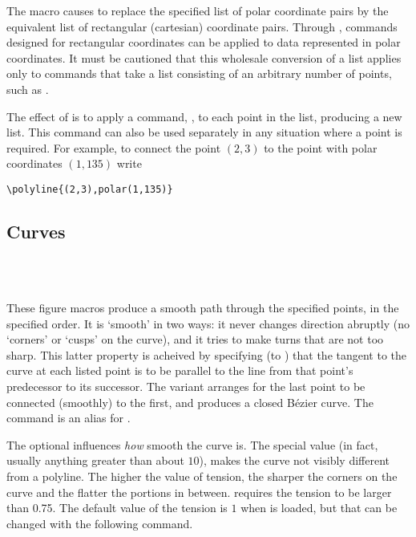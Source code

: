 \documentclass[letterpaper]{article}
\begin{document}
The macro  causes \MF{} to replace the specified list of polar
coordinate pairs by the equivalent list of rectangular (cartesian)
coordinate pairs. Through , commands designed for rectangular
coordinates can be applied to data represented in polar coordinates. It
must be cautioned that this wholesale conversion of a list applies only
to commands that take a list consisting of an arbitrary number of
points, such as .

The effect of  is to apply a \MF{} command, , to each
point in the list, producing a new list. This \MF{} command can also be
used separately in any situation where a \MF{} point is required. For
example, to connect the point $(2,3)$ to the point with polar
coordinates $(1, 135)$ write
\begin{verbatim}
\polyline{(2,3),polar(1,135)}
\end{verbatim}


\subsection{Curves}\label{curves}

\begin{cd}
\\
\\
%
%
%
\end{cd}

These figure macros produce a smooth path through the specified points,
in the specified order. It is `smooth' in two ways: it never changes
direction abruptly (no `corners' or `cusps' on the curve), and it tries
to make turns that are not too sharp. This latter property is acheived
by specifying (to \MF{}) that the tangent to the curve at each listed
point is to be parallel to the line from that point's predecessor to its
successor. The  variant arranges for the last point to be
connected (smoothly) to the first, and produces a closed \MF{} B\'ezier
curve. The command  is an alias for .

The optional  influences \emph{how} smooth the curve is.
The special value  (in fact, usually anything greater than
about $10$), makes the curve not visibly different from a polyline. The
higher the value of tension, the sharper the corners on the curve and
the flatter the portions in between. \CMF{} requires the tension to be
larger than 0.75. The default value of the tension is $1$ when \mfp{} is
loaded, but that can be changed with the following command.
\end{document}
